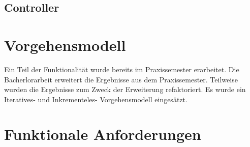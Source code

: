 \subsection{Controller}

\section{Vorgehensmodell}

Ein Teil der Funktionalit\"at wurde bereits im Praxissemester erarbeitet. 
Die Bacherlorarbeit erweitert die Ergebnisse aus dem Praxissemester.
Teilweise wurden die Ergebnisse zum Zweck der Erweiterung refaktoriert.
Es wurde ein Iteratives- und Inkrementeles- Vorgehensmodell einges\"atzt.

\section{Funktionale Anforderungen}



 
